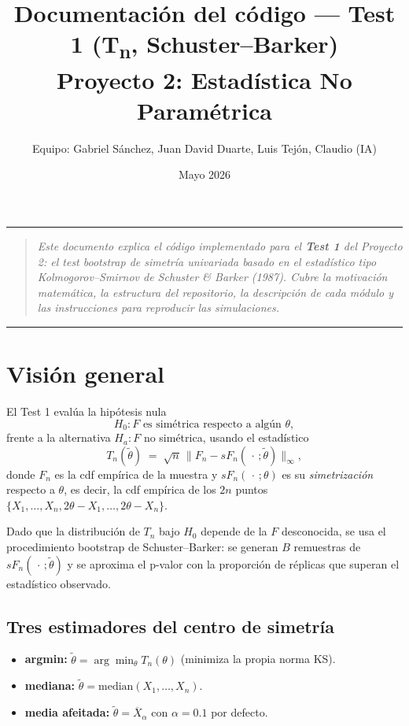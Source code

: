 \documentclass[11pt,a4paper]{article}
\title{\textbf{Documentación del código --- Test 1 (T\textsubscript{n}, Schuster--Barker)}\\[0.5em]
\large Proyecto 2: Estadística No Paramétrica}
\author{Equipo: Gabriel Sánchez, Juan David Duarte, Luis Tejón, Claudio (IA)}
\date{Mayo 2026}
\begin{document}
\maketitle

\hrule
\vspace{0.5em}
\begin{quote}\small\itshape
Este documento explica el código implementado para el \textbf{Test 1} del Proyecto 2:
el test bootstrap de simetría univariada basado en el estadístico tipo Kolmogorov--Smirnov
de Schuster \& Barker (1987). Cubre la motivación matemática, la estructura del repositorio,
la descripción de cada módulo y las instrucciones para reproducir las simulaciones.
\end{quote}
\vspace{0.5em}
\hrule

\tableofcontents
\newpage

\section{Visión general}

El Test 1 evalúa la hipótesis nula
\[
  H_0 : F \text{ es simétrica respecto a algún } \theta,
\]
frente a la alternativa $H_a: F$ no simétrica, usando el estadístico
\[
  T_n(\tilde\theta) \;=\; \sqrt{n}\,\bigl\| F_n - sF_n(\,\cdot\,;\tilde\theta) \bigr\|_\infty,
\]
donde $F_n$ es la cdf empírica de la muestra y $sF_n(\,\cdot\,;\theta)$ es su \emph{simetrización} respecto a $\theta$, es decir, la cdf empírica de los $2n$ puntos $\{X_1,\dots,X_n, 2\theta-X_1,\dots,2\theta-X_n\}$.

Dado que la distribución de $T_n$ bajo $H_0$ depende de la $F$ desconocida, se usa el procedimiento bootstrap de Schuster--Barker: se generan $B$ remuestras de $sF_n(\,\cdot\,;\tilde\theta)$ y se aproxima el p-valor con la proporción de réplicas que superan el estadístico observado.

\subsection{Tres estimadores del centro de simetría}
\begin{itemize}[leftmargin=*]
    \item \textbf{argmin:} $\tilde\theta = \arg\min_\theta T_n(\theta)$ (minimiza la propia norma KS).
    \item \textbf{mediana:} $\tilde\theta = \mathrm{median}(X_1,\dots,X_n)$.
    \item \textbf{media afeitada:} $\tilde\theta = \overline X_\alpha$ con $\alpha = 0.1$ por defecto.
\end{itemize}
\end{document}
